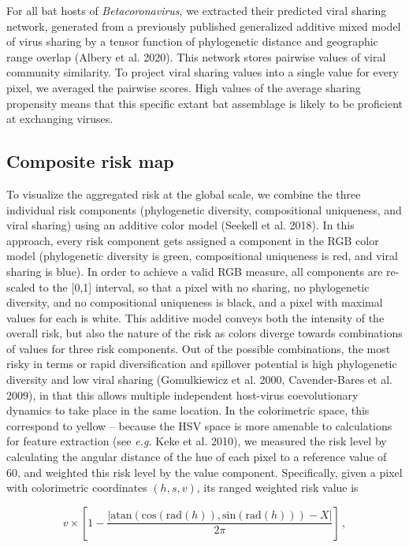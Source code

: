 \documentclass[11pt]{article}
\begin{document}
For all bat hosts of \emph{Betacoronavirus}, we extracted their
predicted viral sharing network, generated from a previously published
generalized additive mixed model of virus sharing by a tensor function
of phylogenetic distance and geographic range overlap (Albery et al.
2020). This network stores pairwise values of viral community
similarity. To project viral sharing values into a single value for
every pixel, we averaged the pairwise scores. High values of the average
sharing propensity means that this specific extant bat assemblage is
likely to be proficient at exchanging viruses.

\hypertarget{composite-risk-map}{%
\subsection{Composite risk map}\label{composite-risk-map}}

To visualize the aggregated risk at the global scale, we combine the
three individual risk components (phylogenetic diversity, compositional
uniqueness, and viral sharing) using an additive color model (Seekell et
al. 2018). In this approach, every risk component gets assigned a
component in the RGB color model (phylogenetic diversity is green,
compositional uniqueness is red, and viral sharing is blue). In order to
achieve a valid RGB measure, all components are re-scaled to the
{[}0,1{]} interval, so that a pixel with no sharing, no phylogenetic
diversity, and no compositional uniqueness is black, and a pixel with
maximal values for each is white. This additive model conveys both the
intensity of the overall risk, but also the nature of the risk as colors
diverge towards combinations of values for three risk components. Out of
the possible combinations, the most risky in terms or rapid
diversification and spillover potential is high phylogenetic diversity
and low viral sharing (Gomulkiewicz et al. 2000, Cavender-Bares et al.
2009), in that this allows multiple independent host-virus
coevolutionary dynamics to take place in the same location. In the
colorimetric space, this correspond to yellow -- because the HSV space
is more amenable to calculations for feature extraction (see \emph{e.g.}
Keke et al. 2010), we measured the risk level by calculating the angular
distance of the hue of each pixel to a reference value of 60, and
weighted this risk level by the value component. Specifically, given a
pixel with colorimetric coordinates \((h,s,v)\), its ranged weighted
risk value is

\[
v\times\left[1-\frac{\left|\text{atan}\left(\text{cos}(\text{rad}(h)), \text{sin}(\text{rad}(h))\right) - X\right|}{2\pi}\right]\,,
\]
\end{document}
